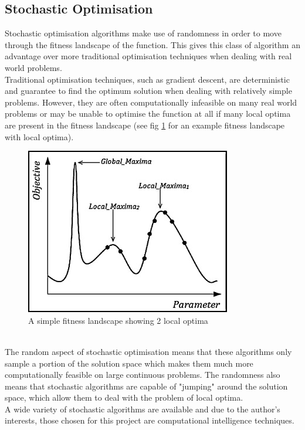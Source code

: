 \subsection{Stochastic Optimisation}
Stochastic optimisation algorithms make use of randomness in order to move through the fitness landscape of the function. This gives this class of algorithm an advantage over more traditional optimisation techniques when dealing with real world problems.
\\Traditional optimisation techniques, such as gradient descent, are deterministic and guarantee to find the optimum solution when dealing with relatively simple problems. However, they are often computationally infeasible on many real world problems or may be unable to optimise the function at all if many local optima are present in the fitness landscape (see fig \ref{fig:local optima}\cite{localo} for an example fitness landscape with local optima).
\begin{figure}[tp]
   \begin{center}
     \includegraphics{Figures/local_optima}
   \end{center}
   \caption{A simple fitness landscape showing 2 local optima}
   \label{fig:local optima}
\end{figure}
\\The random aspect of stochastic optimisation means that these algorithms only sample a portion of the solution space which makes them much more computationally feasible on large continuous problems. The randomness also means that stochastic algorithms are capable of "jumping" around the solution space, which allow them to deal with the problem of local optima.
\\A wide variety of stochastic algorithms are available and due to the author's interests, those chosen for this project are computational intelligence techniques.

